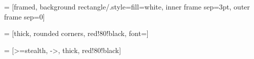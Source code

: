  = [framed, background rectangle/.style={fill=white}, inner frame sep=3pt, outer frame sep=0]

 = [thick, rounded corners, red!80!black, font=\footnotesize]

 = [>=stealth, ->, thick, red!80!black]

\newcommand{\umlblock}[4][2.5cm]{%
    \frame{%
        \begin{minipage}[t][#1]{\ifdim#4=0cm 4cm \else #4 \fi}
            {\centering
            \vspace{4pt}
            \makebox[1.1\width][c]{#2}\vspace{3pt}
            \hrule}
            \vspace{3pt}
            \begin{tabular}{l}
                #3
            \end{tabular}
        \end{minipage}%
    }
}

\newcommand{\id}{\refstepcounter{id}\large\textsf{\Alph{id}}}

\newcommand{\hrel}[5][16pt]{\draw[-] (#2) node[L, inner sep=#1] at (#2.east) {#3} -- (#4) node[R, inner sep=#1] at (#4.west) {#5};}
\newcommand{\vrel}[5][8pt]{\draw[-] (#2) node[align=right, anchor=east, yshift=-#1, xshift=18pt] at (#2.south) {#3} -- (#4) node[align=right, anchor=east, yshift=#1, xshift=18pt] at (#4.north) {#5};}


